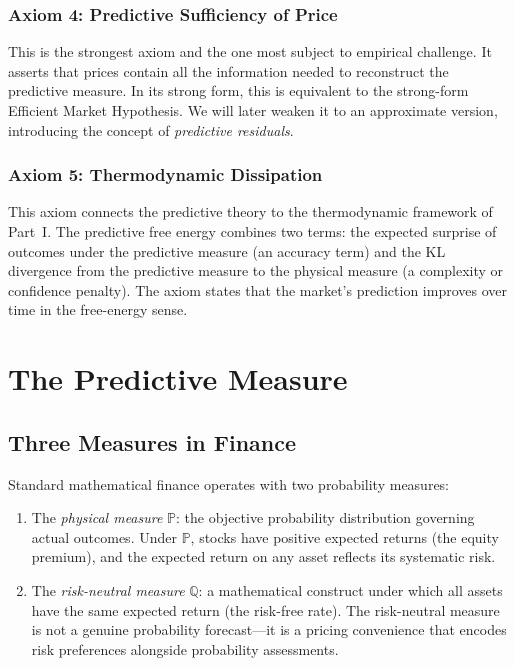 \documentclass[12pt,a4paper]{article}
\theoremstyle{definition}
\newcommand{\Prob}{\mathbb{P}}
\newcommand{\Q}{\mathbb{Q}}
\begin{document}
\subsubsection{Axiom 4: Predictive Sufficiency of Price}

This is the strongest axiom and the one most subject to empirical challenge. It asserts that prices contain all the information needed to reconstruct the predictive measure. In its strong form, this is equivalent to the strong-form Efficient Market Hypothesis. We will later weaken it to an approximate version, introducing the concept of \emph{predictive residuals}.

\subsubsection{Axiom 5: Thermodynamic Dissipation}

This axiom connects the predictive theory to the thermodynamic framework of Part~I. The predictive free energy combines two terms: the expected surprise of outcomes under the predictive measure (an accuracy term) and the KL divergence from the predictive measure to the physical measure (a complexity or confidence penalty). The axiom states that the market's prediction improves over time in the free-energy sense.



\section{The Predictive Measure}\label{sec:predictive_measure}

\subsection{Three Measures in Finance}

Standard mathematical finance operates with two probability measures:

\begin{enumerate}[label=(\roman*)]
    \item The \emph{physical measure} $\Prob$: the objective probability distribution governing actual outcomes. Under $\Prob$, stocks have positive expected returns (the equity premium), and the expected return on any asset reflects its systematic risk.
    
    \item The \emph{risk-neutral measure} $\Q$: a mathematical construct under which all assets have the same expected return (the risk-free rate). The risk-neutral measure is not a genuine probability forecast---it is a pricing convenience that encodes risk preferences alongside probability assessments.
\end{enumerate}
\end{document}
